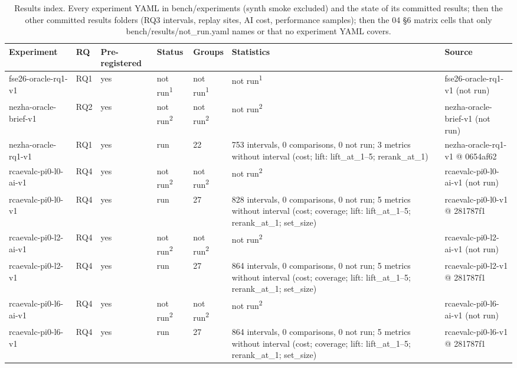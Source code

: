 \begin{table}[t]
\centering
\caption{Results index. Every experiment YAML in bench/experiments (synth smoke excluded) and the state of its committed results; then the other committed results folders (RQ3 intervals, replay sites, AI cost, performance samples); then the 04 \S{}6 matrix cells that only bench/results/not\_run.yaml names or that no experiment YAML covers.}
\label{tab:a0-results-index}
\small
\begin{tabular}{lllllll}
\hline
Experiment & RQ & Pre-registered & Status & Groups & Statistics & Source \\
\hline
fse26-oracle-rq1-v1 & RQ1 & yes & not run\textsuperscript{1} & not run\textsuperscript{1} & not run\textsuperscript{1} & fse26-oracle-rq1-v1 (not run) \\
nezha-oracle-brief-v1 & RQ2 & yes & not run\textsuperscript{2} & not run\textsuperscript{2} & not run\textsuperscript{2} & nezha-oracle-brief-v1 (not run) \\
nezha-oracle-rq1-v1 & RQ1 & yes & run & 22 & 753 intervals, 0 comparisons, 0 not run; 3 metrics without interval (cost; lift: lift\_at\_1--5; rerank\_at\_1) & nezha-oracle-rq1-v1 @ 0654af62 \\
rcaevalc-pi0-l0-ai-v1 & RQ4 & yes & not run\textsuperscript{2} & not run\textsuperscript{2} & not run\textsuperscript{2} & rcaevalc-pi0-l0-ai-v1 (not run) \\
rcaevalc-pi0-l0-v1 & RQ4 & yes & run & 27 & 828 intervals, 0 comparisons, 0 not run; 5 metrics without interval (cost; coverage; lift: lift\_at\_1--5; rerank\_at\_1; set\_size) & rcaevalc-pi0-l0-v1 @ 281787f1 \\
rcaevalc-pi0-l2-ai-v1 & RQ4 & yes & not run\textsuperscript{2} & not run\textsuperscript{2} & not run\textsuperscript{2} & rcaevalc-pi0-l2-ai-v1 (not run) \\
rcaevalc-pi0-l2-v1 & RQ4 & yes & run & 27 & 864 intervals, 0 comparisons, 0 not run; 5 metrics without interval (cost; coverage; lift: lift\_at\_1--5; rerank\_at\_1; set\_size) & rcaevalc-pi0-l2-v1 @ 281787f1 \\
rcaevalc-pi0-l6-ai-v1 & RQ4 & yes & not run\textsuperscript{2} & not run\textsuperscript{2} & not run\textsuperscript{2} & rcaevalc-pi0-l6-ai-v1 (not run) \\
rcaevalc-pi0-l6-v1 & RQ4 & yes & run & 27 & 864 intervals, 0 comparisons, 0 not run; 5 metrics without interval (cost; coverage; lift: lift\_at\_1--5; rerank\_at\_1; set\_size) & rcaevalc-pi0-l6-v1 @ 281787f1 \\

\end{tabular}
\end{table}
